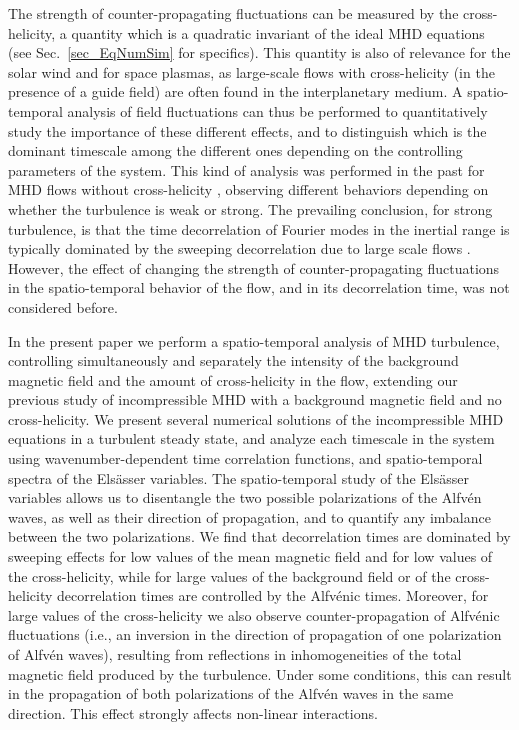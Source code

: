 \documentclass[aip,pop,reprint,amsmath,amssymb,floatfix]{revtex4-1}
\begin{document}
The strength of counter-propagating fluctuations can be measured by
the cross-helicity, a quantity which is a quadratic invariant of the
ideal MHD equations (see Sec.~\ref{sec_EqNumSim} for specifics). This
quantity is also of relevance for the solar wind and for space
plasmas, as large-scale flows with cross-helicity (in the presence of
a guide field) are often found in the interplanetary medium. A
spatio-temporal analysis of field fluctuations
\cite{servidio_time_2011, clark_di_leoni_spatio-temporal_2015} can
thus be performed to quantitatively study the importance of these
different effects, and to distinguish which is the dominant timescale
among the different ones depending on the controlling parameters of
the system. This kind of analysis was performed in the past for MHD
flows without cross-helicity \cite{meyrand_weak_2015,
  lugones_2016_spatiotemporal, meyrand_direct_2016}, observing
different behaviors depending on whether the turbulence is weak or
strong. The prevailing conclusion, for strong turbulence, is that the
time decorrelation of Fourier modes in the inertial range is typically
dominated by the sweeping decorrelation due to large scale flows
\cite{servidio_time_2011, chen_sweeping_1989,
  lugones_2016_spatiotemporal}.  However, the effect of changing the
strength of counter-propagating fluctuations in the spatio-temporal
behavior of the flow, and in its decorrelation time, was not
considered before.

In the present paper we perform a spatio-temporal analysis of MHD
turbulence, controlling simultaneously and separately the intensity of
the background magnetic field and the amount of cross-helicity in the
flow, extending our previous study \cite{lugones_2016_spatiotemporal}
of incompressible MHD with a background magnetic field and no
cross-helicity. We present several numerical solutions of the
incompressible MHD equations in a turbulent steady state, and analyze
each timescale in the system using wavenumber-dependent time
correlation functions, and spatio-temporal spectra of the Els\"asser
variables. The spatio-temporal study of the Els\"asser variables
allows us to disentangle the two possible polarizations of the
Alfv\'en waves, as well as their direction of propagation, and to
quantify any imbalance between the two polarizations. We find that
decorrelation times are dominated by sweeping effects for low values
of the mean magnetic field and for low values of the cross-helicity,
while for large values of the background field or of the
cross-helicity decorrelation times are controlled by the Alfv\'enic
times. Moreover, for large values of the cross-helicity we also
observe counter-propagation of Alfv\'enic fluctuations (i.e., an
inversion in the direction of propagation of one polarization of
Alfv\'en waves), resulting from reflections in inhomogeneities of the
total magnetic field produced by the turbulence. Under some
conditions, this can result in the propagation of both polarizations
of the Alfv\'en waves in the same direction. This effect strongly
affects non-linear interactions.
\end{document}
